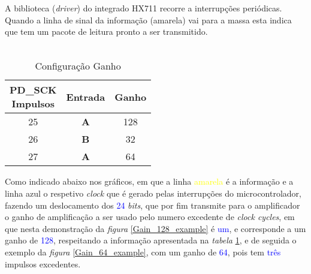 A biblioteca (\textit{driver}) do integrado HX711 recorre a interrupções periódicas. Quando a linha de sinal da informação (amarela) vai para a massa esta indica que tem um pacote de leitura pronto a ser transmitido.
\\
\\
\begin{minipage}[!b]{\linewidth}
\begin{minipage}[!b]{.45\linewidth}
	\begin{table}[H]
		\captionsetup{justification=raggedright,singlelinecheck=false}
		\caption{Configuração Ganho}
		\begin{tabular}{ | c | c | c |  }
			\hline
			\makecell[c]{PD\_SCK \\ Impulsos} & Entrada  & Ganho \\
			\hline
			\hline
			25 & \textbf{A} & 128 \\
			\hline
			26 & \textbf{B} & 32 \\
			\hline
			27 & \textbf{A} & 64 \\
			\hline
		\end{tabular}
		\label{Gain_Selection}
	\end{table}
\end{minipage}
\begin{minipage}[l]{.53\linewidth}
\vspace{.1cm}
Como indicado abaixo nos gráficos, em que a linha \textcolor{yellow}{amarela} é a informação e a linha \textcolor{BlueGreen}{azul} o respetivo \textit{clock} que é gerado pelas interrupções do microcontrolador, fazendo um deslocamento dos \textcolor{blue}{24} \textit{bits}, que por fim transmite para o amplificador o ganho de amplificação a ser usado pelo numero excedente de \textit{clock cycles}, em que nesta demonstração da \textit{figura} \ref{Gain_128_example} é \textcolor{blue}{um}, e corresponde a um ganho de \textcolor{blue}{128}, respeitando a informação apresentada na \textit{tabela} \ref{Gain_Selection},  e de seguida o exemplo da \textit{figura} \ref{Gain_64_example}, com um ganho de \textcolor{blue}{64}, pois tem \textcolor{blue}{três} impulsos excedentes.
\end{minipage}
\end{minipage}
\\

